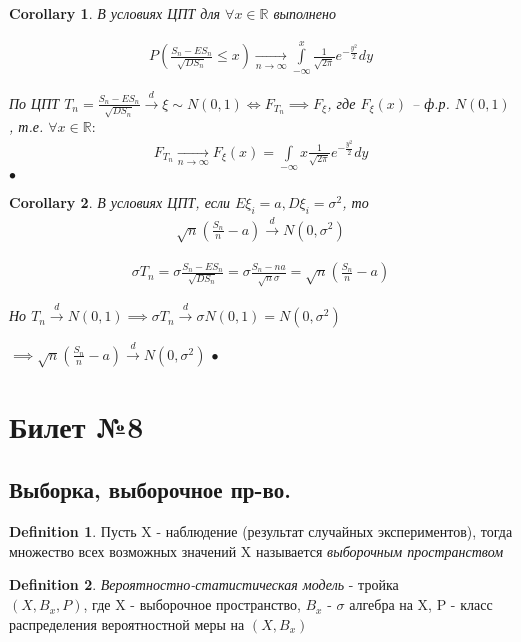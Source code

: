 \documentclass[a4paper]{article}
\theoremstyle{plain}
\newtheorem{corollary}{Corollary}
\theoremstyle{remark}
\theoremstyle{definition}
\newtheorem{definition}{Definition}
\renewenvironment{proof}{{\bfseries Proof}}{$\bullet$}
\newcommand{\pars}[1]{\left( #1 \right)}
\newcommand{\setR}{\mathbb{R}}
\newcommand{\toup}[1]{\xrightarrow{#1}}
\newcommand{\todown}[1]{\xrightarrow[#1]{}}
\renewcommand{\leq}{\leqslant}
\begin{document}
\begin{corollary}
  В условиях ЦПТ для $\forall x \in \setR$ выполнено
  
  \begin{align*}
    P\pars{\frac{S_n - E S_n}{\sqrt{D S_n}} \leq x} 
    \todown{n \to \infty} \int\limits_{-\infty}^{x} \frac{1}{\sqrt{2\pi}} e^{-\frac{y^2}{2}} dy
  \end{align*}

  \begin{proof}
    По ЦПТ $T_n = \frac{S_n - E S_n}{\sqrt{D S_n}} \toup{d} \xi \sim N(0, 1) 
    \iff F_{T_n} \implies F_{\xi}$, где $F_{\xi} (x)$  -- ф.р. $N(0, 1)$, т.е.
    $\forall x \in \setR:$
    \begin{align*}
      F_{T_n} \todown{n \to \infty} F_{\xi} (x) 
      = \int\limits_{-\infty}{x} \frac{1}{\sqrt{2 \pi}} e^{-\frac{y^2}{2}} dy
    \end{align*}
  \end{proof}
\end{corollary}

\begin{corollary}
  В условиях ЦПТ, если $E \xi_i = a, D \xi_i = \sigma^2$, то
  \begin{align*}
    \sqrt{n} \pars{\frac{S_n}{n} - a} \toup{d} N(0, \sigma^2)
  \end{align*}

  \begin{proof}
    \begin{align*}
      \sigma T_n = \sigma \frac{S_n - E S_n}{\sqrt{D S_n}} 
      = \sigma \frac{S_n - na}{\sqrt{n} \sigma} = \sqrt{n} \pars{\frac{S_n}{n} - a}
    \end{align*}

    Но $T_n \toup{d} N(0, 1) \implies \sigma T_n \toup{d} \sigma N(0, 1) = N(0, \sigma^2)$

    $\implies \sqrt{n} \pars{\frac{S_n}{n} - a} \toup{d} N(0, \sigma^2)$
  \end{proof}
\end{corollary}

\newpage
\section{Билет №8}
\subsection{Выборка, выборочное пр-во.}
\begin{definition}
Пусть X - наблюдение (результат случайных экспериментов), тогда множество всех возможных значений X называется \emph{выборочным пространством}
\end{definition}
\begin{definition}
\emph{Вероятностно-статистическая модель} - тройка\\
$(X, B_x, P)$, где X - выборочное пространство, $B_x$ - $\sigma$ алгебра на X, P - класс распределения вероятностной меры на $(X, B_x)$
\end{definition}
\end{document}
